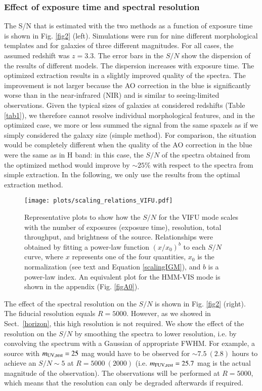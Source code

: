 \documentclass{aa}
\begin{document}
\subsubsection{Effect of exposure time and spectral resolution}
\label{scaling}

The S/N that is estimated with the two methods as a function of exposure time is shown in Fig. \ref{fig2} (left). Simulations were run for nine different morphological templates and for galaxies of three different magnitudes. For all cases, the assumed redshift was $z = 3.3$. The error bars in the $S/N$ show the dispersion of the results of different models. The dispersion increases with exposure time. The optimized extraction results in a slightly improved quality of the spectra. The improvement is not larger because the AO correction in the blue is significantly worse than in the near-infrared (NIR) and is similar to seeing-limited observations. Given the typical sizes of galaxies at considered redshifts (Table \ref{tab1}), we therefore cannot resolve individual morphological features, and in the optimized case, we more or less summed the signal from the same spaxels as if we simply considered the galaxy size (simple method). For comparison, the situation would be completely different when the quality of the AO correction in the blue were the same as in H band: in this case, the $S/N$ of the spectra obtained from the optimized method would improve by $\sim 25 \%$ with respect to the spectra from simple extraction. In the following, we only use the results from the optimal extraction method.

\begin{figure*}
\begin{center}
\texttt{[image: plots/scaling\_relations\_VIFU.pdf]}
\caption{Representative plots to show how the $S/N$ for the VIFU mode scales with the number of exposures (exposure time), resolution, total throughput, and brightness of the source. Relationships were obtained by fitting a power-law function $\left( x/x_{0}\right)^{b}$ to each $S/N$ curve, where $x$ represents one of the four quantities, $x_{0}$ is the  normalization (see text and Equation \ref{scalingIGM}), and $b$ is a power-law index. An equivalent plot for the HMM-VIS mode is shown in the appendix (Fig. \ref{figA0}).}
\label{fig3}
\end{center}
\end{figure*}

The effect of the spectral resolution on the $S/N$ is shown in Fig. \ref{fig2} (right). The fiducial resolution equals $R=5000$. However, as we showed in Sect.~\ref{horizon}, this high resolution is not required. We show the effect of the resolution on the $S/N$ by smoothing the spectra to lower resolution, i.e. by convolving the spectrum with a Gaussian of appropriate FWHM. For example, a source with $m_{\rm UV,rest} = 25$ mag would have to be observed for $\sim 7.5~(2.8)$ hours to achieve an $S/N\sim5$ at $R = 5000~(2000)$ (i.e. $m_{\rm FUV,rest} = 25.7$ mag is the actual magnitude of the observation). The observations will be performed at $R=5000$, which means that the resolution can only be degraded afterwards if required.
\end{document}
